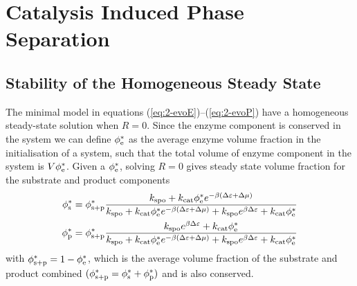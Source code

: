 \section{Catalysis Induced Phase Separation}
\subsection{Stability of the Homogeneous Steady State}
The minimal model in equations (\ref{eq:2-evoE})--(\ref{eq:2-evoP}) have a homogeneous steady-state solution when $R=0$. Since the enzyme component is conserved in the system we can define $\phi_{\mathrm{e}}^*$ as the average enzyme volume fraction in the initialisation of a system, such that the total volume of enzyme component in the system is $V \phi_{\mathrm{e}}^*$. Given a $\phi_{\mathrm{e}}^*$, solving $R=0$ gives steady state volume fraction for the substrate and product components
\begin{align}
    \phi_{\mathrm{s}}^* &= \phi_{\mathrm{s+p}}^*\frac{k_{\mathrm{spo}} + k_{\mathrm{cat}}\phi_{\mathrm{e}}^*e^{-\beta(\Delta \varepsilon + \Delta\mu)}}{k_{\mathrm{spo}} + k_{\mathrm{cat}}\phi_{\mathrm{e}}^*e^{-\beta (\Delta \varepsilon + \Delta\mu)}+k_{\mathrm{spo}} e^{\beta \Delta \varepsilon} + k_{\mathrm{cat}}\phi_{\mathrm{e}}^*}
    \label{eq:2-sstar}
    \\
    \phi_{\mathrm{p}}^* &= \phi_{\mathrm{s+p}}^*\frac{k_{\mathrm{spo}} e^{\beta \Delta \varepsilon} + k_{\mathrm{cat}}\phi_{\mathrm{e}}^*}{k_{\mathrm{spo}} + k_{\mathrm{cat}}\phi_{\mathrm{e}}^*e^{-\beta (\Delta \varepsilon + \Delta\mu)}+k_{\mathrm{spo}} e^{\beta \Delta \varepsilon} + k_{\mathrm{cat}}\phi_{\mathrm{e}}^*}
    \label{eq:2-pstar}
\end{align}
with $\phi_{\mathrm{s+p}}^*=1-\phi_{\mathrm{e}}^*$, which is the average volume fraction of the substrate and product combined $(\phi_{\mathrm{s+p}}^*=\phi_{\mathrm{s}}^*+\phi_{\mathrm{p}}^*)$ and is also conserved.


